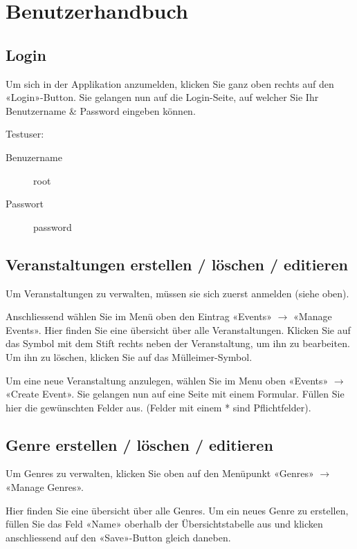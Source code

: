 \documentclass[11pt,a4paper,titlepage,portrait,ngerman,final]{scrartcl}
\title{\docTitle}
\subtitle{\docSubtitle}
\author{\large\scshape\docAuthor}
\date{\normalsize\scshape\docDate}
\begin{document}
\maketitle
\newpage
\tableofcontents
\newpage
\section{Benutzerhandbuch}
\subsection{Login}
Um sich in der Applikation anzumelden, klicken Sie ganz oben rechts auf den «Login»-Button.
Sie gelangen nun auf die Login-Seite, auf welcher Sie Ihr Benutzername \& Password eingeben können.

Testuser:
\begin{description}
\item[Benuzername] root
\item[Passwort] password
\end{description}

\subsection{Veranstaltungen erstellen / löschen / editieren}
Um Veranstaltungen zu verwalten, müssen sie sich zuerst anmelden (siehe oben).

Anschliessend wählen Sie im Menü oben den Eintrag «Events» $\rightarrow$ «Manage Events».
Hier finden Sie eine übersicht über alle Veranstaltungen. Klicken Sie auf das Symbol mit dem Stift rechts neben der Veranstaltung, um ihn zu bearbeiten. Um ihn zu löschen, klicken Sie auf das Mülleimer-Symbol.

Um eine neue Veranstaltung anzulegen, wählen Sie im Menu oben «Events» $\rightarrow$ «Create Event».
Sie gelangen nun auf eine Seite mit einem Formular. Füllen Sie hier die gewünschten Felder aus. (Felder mit einem * sind Pflichtfelder).

\subsection{Genre erstellen / löschen / editieren}
Um Genres zu verwalten, klicken Sie oben auf den Menüpunkt «Genres» $\rightarrow$ «Manage Genres».

Hier finden Sie eine übersicht über alle Genres. Um ein neues Genre zu erstellen, füllen Sie das Feld «Name» oberhalb der Übersichtstabelle aus und klicken anschliessend auf den «Save»-Button gleich daneben.
\end{document}
